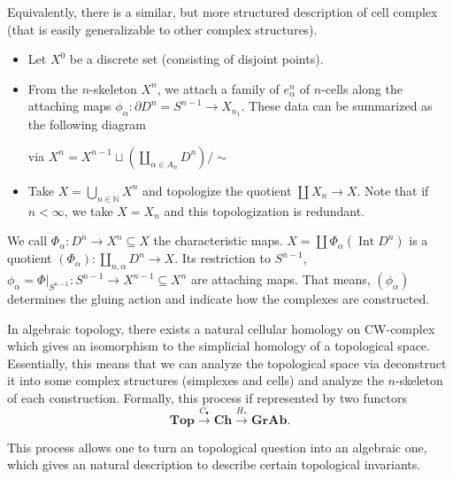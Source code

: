 \documentclass[article,11pt, reqno]{article}
\theoremstyle{remark}
\newcommand{\tb}{\textbf}
\newcommand{\mb}{\mathbb}
\DeclareMathOperator{\interior}{Int}
\newcommand{\<}{\langle}
\renewcommand{\>}{\rangle}
\begin{document}
Equivalently, there is a similar, but more structured description of cell complex (that is easily generalizable to other complex structures).
\begin{itemize}
    \item Let $X^0$ be a discrete set (consisting of disjoint points).
    \item From the $n$-skeleton $X^n$, we attach a family of $e^n_\alpha$ of $n$-cells along the attaching maps $\phi_\alpha:\partial D^n=S^{n-1}\rightarrow X_{n_1}$. These data can be summarized as the following diagram
    \begin{center}
    \tikzcdset{labels={font=\everymath\expandafter{\the\everymath\textstyle}}}
    \end{center}
    via $X^n=X^{n-1}\sqcup (\coprod_{\alpha\in A_n} D^n)/\sim$
    \item Take $X=\bigcup_{n\in\mb N} X^n$ and topologize the quotient $\coprod X_n\rightarrow X$. Note that if $n<\infty$, we take $X=X_n$ and this topologization is redundant.
\end{itemize}

We call $\Phi_\alpha: D^n\rightarrow X^n\subseteq X$ the characteristic maps. $X = \coprod \Phi_\alpha(\interior D^n)$ is a quotient $(\Phi_\alpha):\coprod_{n,\alpha} D^n\rightarrow X$. Its restriction to $S^{n-1}$, $\phi_\alpha = \Phi|_{S^{n-1}}:S^{n-1}\rightarrow X^{n-1}\subseteq X^n$ are attaching maps. That means, $(\phi_\alpha)$ determines the gluing action and indicate how the complexes are constructed.

In algebraic topology, there exists a natural cellular homology on CW-complex which gives an isomorphism to the simplicial homology of a topological space. Essentially, this means that we can analyze the topological space via deconstruct it into some complex structures (simplexes and cells) and analyze the $n$-skeleton of each construction. Formally, this process if represented by two functors
$$\tb{Top}\xrightarrow{C_\bullet} \tb{Ch}\xrightarrow{H_*}\tb{GrAb}.$$

This process allows one to turn an topological question into an algebraic one, which gives an natural description to describe certain topological invariants.
\end{document}
